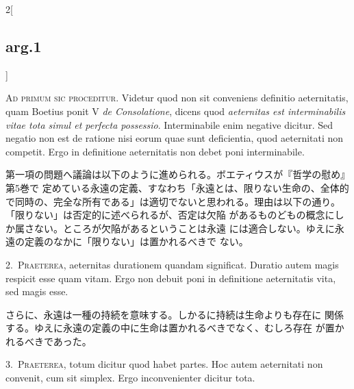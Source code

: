 \documentclass[paper=a4paper,fontsize=10pt,jafontsize=9pt,titlepage]{jlreq}
\begin{document}
{}
\setcounter{section}{1}
\setcounter{subsection}{0}

\begin{paracol}{2}[\subsection{arg.1}]

{\huge A}{\scshape d primum sic proceditur}. Videtur quod non sit conveniens definitio
aeternitatis, quam Boetius ponit V {\itshape de Consolatione}, dicens quod
{\itshape aeternitas est interminabilis vitae tota simul et perfecta
possessio}. Interminabile enim negative dicitur. Sed negatio non est de
ratione nisi eorum quae sunt deficientia, quod aeternitati non
competit. Ergo in definitione aeternitatis non debet poni interminabile.

\switchcolumn

第一項の問題へ議論は以下のように進められる。ボエティウスが『哲学の慰め』第5巻で
定めている永遠の定義、すなわち「永遠とは、限りない生命の、全体的で同時の、完全な所有である」は適切でないと思われる。理由は以下の通り。
「限りない」は否定的に述べられるが、否定は欠陥
があるものどもの概念にしか属さない。ところが欠陥があるということは永遠
には適合しない。ゆえに永遠の定義のなかに「限りない」は置かれるべきで
ない。


2.~{\scshape Praeterea}, aeternitas durationem quandam significat. Duratio autem
magis respicit esse quam vitam. Ergo non debuit poni in definitione
aeternitatis vita, sed magis esse.

\switchcolumn

さらに、永遠は一種の持続を意味する。しかるに持続は生命よりも存在に
関係する。ゆえに永遠の定義の中に生命は置かれるべきでなく、むしろ存在
が置かれるべきであった。


3.~{\scshape Praeterea}, totum dicitur quod habet partes. Hoc autem aeternitati
non convenit, cum sit simplex. Ergo inconvenienter dicitur tota.


\end{paracol}
\end{document}

